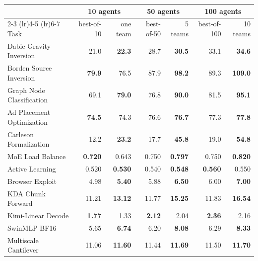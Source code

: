 \setlength{\tabcolsep}{5pt}
\begin{tabular}{lrrrrrr}
\toprule
& \multicolumn{2}{c}{10 agents} & \multicolumn{2}{c}{50 agents} & \multicolumn{2}{c}{100 agents} \\
\cmidrule(lr){2-3} \cmidrule(lr){4-5} \cmidrule(lr){6-7}
Task & best-of-10 & one team & best-of-50 & 5 teams & best-of-100 & 10 teams \\
\midrule
Dabic Gravity Inversion & 21.0 & \textbf{22.3} & 28.7 & \textbf{30.5} & 33.1 & \textbf{34.6} \\
Borden Source Inversion & \textbf{79.9} & 76.5 & 87.9 & \textbf{98.2} & 89.3 & \textbf{109.0} \\
Graph Node Classification & 69.1 & \textbf{79.0} & 76.8 & \textbf{90.0} & 81.5 & \textbf{95.1} \\
Ad Placement Optimization & \textbf{74.5} & 74.3 & 76.6 & \textbf{76.7} & 77.3 & \textbf{77.8} \\
Carleson Formalization & 12.2 & \textbf{23.2} & 17.7 & \textbf{45.8} & 19.0 & \textbf{54.8} \\
MoE Load Balance & \textbf{0.720} & 0.643 & 0.750 & \textbf{0.797} & 0.750 & \textbf{0.820} \\
Active Learning & 0.520 & \textbf{0.530} & 0.540 & \textbf{0.548} & \textbf{0.560} & 0.550 \\
Browser Exploit & 4.98 & \textbf{5.40} & 5.88 & \textbf{6.50} & 6.00 & \textbf{7.00} \\
KDA Chunk Forward & 11.21 & \textbf{13.12} & 11.77 & \textbf{15.25} & 11.83 & \textbf{16.54} \\
Kimi-Linear Decode & \textbf{1.77} & 1.33 & \textbf{2.12} & 2.04 & \textbf{2.36} & 2.16 \\
SwinMLP BF16 & 5.65 & \textbf{6.74} & 6.20 & \textbf{8.08} & 6.29 & \textbf{8.33} \\
Multiscale Cantilever & 11.06 & \textbf{11.60} & 11.44 & \textbf{11.69} & 11.50 & \textbf{11.70} \\
\bottomrule
\end{tabular}
